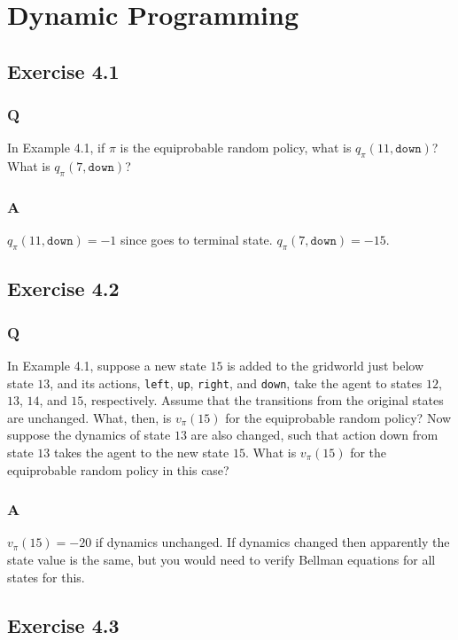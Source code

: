 \section{Dynamic Programming}

\subsection{Exercise 4.1}
\subsubsection*{Q}
In Example 4.1, if $\pi$ is the equiprobable random policy, what is $q_\pi(11, \mathtt{down})$? What is $q_\pi(7, \mathtt{down})$?

\subsubsection*{A}
$q_\pi(11, \mathtt{down}) = -1$ since goes to terminal state. $q_\pi(7, \mathtt{down}) = -15$.

\subsection{Exercise 4.2}
\subsubsection*{Q}
In Example 4.1, suppose a new state $15$ is added to the gridworld just below state $13$, and its actions, \texttt{left}, \texttt{up}, \texttt{right}, and \texttt{down}, take the agent to states $12$, $13$, $14$, and $15$, respectively. Assume that the transitions from the original states are unchanged. What, then, is $v_\pi(15)$ for the equiprobable random policy? Now suppose the dynamics of state $13$ are also changed, such that action down from state $13$ takes the agent to the new state $15$. What is $v_\pi(15)$ for the equiprobable random policy in this case?

\subsubsection*{A}
$v_\pi(15) = -20$ if dynamics unchanged. If dynamics changed then apparently the state value is the same, but you would need to verify Bellman equations for all states for this.

\subsection{Exercise 4.3}
